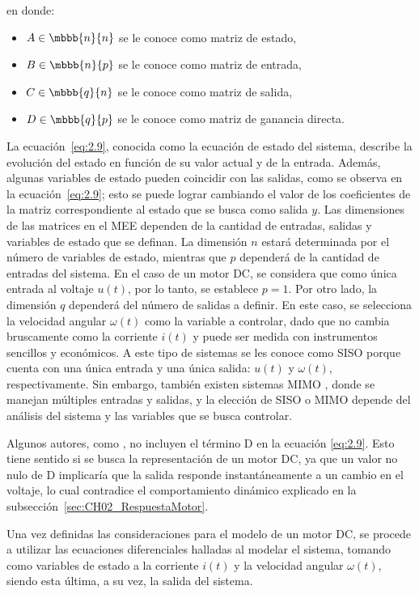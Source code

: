 en donde:
\begin{itemize}
    \item $A \in\mbbb{n}{n}$ se le conoce como matriz de estado,
    \item $B \in\mbbb{n}{p} $ se le conoce como matriz de entrada,
    \item $C \in\mbbb{q}{n} $ se le conoce como matriz de salida,
    \item $D \in\mbbb{q}{p} $ se le conoce como matriz de ganancia directa.
\end{itemize}
La ecuación~\ref{eq:2.9}, conocida como la ecuación de estado del sistema, describe la evolución del estado en función de su valor actual y de la entrada. Además, algunas variables de estado pueden coincidir con las salidas, como se observa en la ecuación~\ref{eq:2.9}; esto se puede lograr cambiando el valor de los coeficientes de la matriz correspondiente al estado que se busca como salida $y$.
Las dimensiones de las matrices en el \ac{MEE} dependen de la cantidad de entradas, salidas y variables de estado que se definan. La dimensión $n$ estará determinada por el número de variables de estado, mientras que $p$ dependerá de la cantidad de entradas del sistema. En el caso de un motor \ac{DC}, se considera que como única entrada al voltaje $u(t)$, por lo tanto, se establece $p=1$. Por otro lado, la dimensión $q$ dependerá del número de salidas a definir. En este caso, se selecciona la velocidad angular $\omega(t)$ como la variable a controlar, dado que no cambia bruscamente como la corriente $i(t)$ y puede ser medida con instrumentos sencillos y económicos. A este tipo de sistemas se les conoce como \ac{SISO} porque cuenta con una única entrada y una única salida: $u(t)$ y $\omega(t)$, respectivamente. Sin embargo, también existen sistemas \ac{MIMO} , donde se manejan múltiples entradas y salidas, y la elección de \ac{SISO} o \ac{MIMO} depende del análisis del sistema y las variables que se busca controlar.

Algunos autores, como \textcite{MEE}, no incluyen el término D en la ecuación \ref{eq:2.9}. Esto tiene sentido si se busca la  representación de un motor \ac{DC}, ya que un valor no nulo de D implicaría que la salida responde instantáneamente a un cambio en el voltaje, lo cual contradice el comportamiento dinámico explicado en la subsección~\ref{sec:CH02_RespuestaMotor}.

Una vez definidas las consideraciones para el modelo de un motor \ac{DC}, se procede a utilizar las ecuaciones diferenciales halladas al modelar el sistema, tomando como variables de estado a la corriente $i(t)$ y la velocidad angular $\omega(t)$, siendo esta última, a su vez, la salida del sistema.

